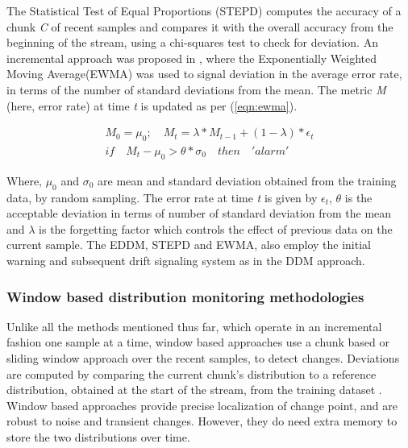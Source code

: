 \documentclass[authoryear,3p,times,twocolumn]{elsarticle}
\begin{document}
The Statistical Test of Equal Proportions (STEPD) \citep{nishida2007detecting} computes the accuracy of a chunk \textit{C} of recent samples and compares it with the overall accuracy from the beginning of the stream, using a chi-squares test to check for deviation. An incremental approach was proposed in  \citep{ross2012exponentially}, where the Exponentially Weighted Moving Average(EWMA) was used to signal deviation in the average error rate, in terms of the number of standard deviations from the mean. The metric \textit{M} (here, error rate) at time \textit{t} is updated as per (\ref{eqn:ewma}). 

\begin{equation} \label{eqn:ewma}
\begin{aligned}
{ M }_{ 0 }=\mu_0; \quad { M }_{ t }=\lambda *{ M }_{ t-1 }+ (1-\lambda)*\epsilon_t
\\ if\quad { M }_{ t }-\mu_0>\theta * \sigma_0 \quad then\quad 'alarm'
\end{aligned}
\end{equation}

Where, $\mu_0$ and $\sigma_0$ are mean and standard deviation obtained from the training data, by random sampling. The error rate at time \textit{t} is given by $\epsilon_t$, $\theta$ is the acceptable deviation in terms of number of standard deviation from the mean and $\lambda$ is the forgetting factor which controls the effect of previous data on the current sample. The EDDM, STEPD and EWMA, also employ the initial warning and subsequent drift signaling system as in the DDM approach. 

\subsubsection{Window based distribution monitoring methodologies}
\label{sec:lr_window}
Unlike all the methods mentioned thus far, which operate in an incremental fashion one sample at a time, window based approaches use a chunk based or sliding window approach over the recent samples, to detect changes. Deviations are computed by comparing the current chunk's distribution to a reference distribution, obtained at the start of the stream, from the training dataset \citep{bifet2007learning}. Window based approaches provide precise localization of change point, and are robust to noise and transient changes. However, they do need extra memory to store the two distributions over time. 
\end{document}
